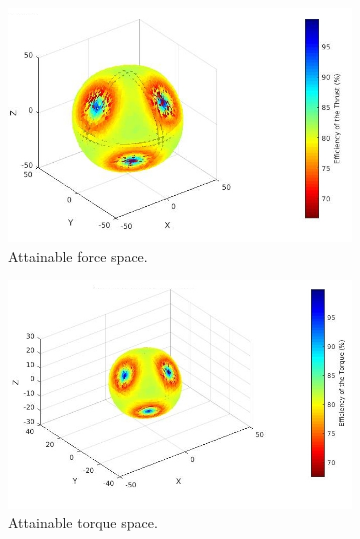\begin{figure}[!ht]
  \begin{center}
  \begin{subfigure}[b]{0.46\textwidth}
    \includegraphics[width=\linewidth]{images/Hexa_fspace.jpg}
    \caption{Attainable force space.} \label{fig:hexa_fspace}
  \end{subfigure}
  \hspace*{\fill} %
  \begin{subfigure}[b]{0.48\textwidth}
    \centering
    \includegraphics[width=\linewidth]{images/Hexa_tspace.jpg}
    \caption{Attainable torque space.} \label{fig:hexa_tspace}
  \end{subfigure}
  \begin{subfigure}[b]{0.5\textwidth}

\end{subfigure}
\end{center}
\end{figure}
